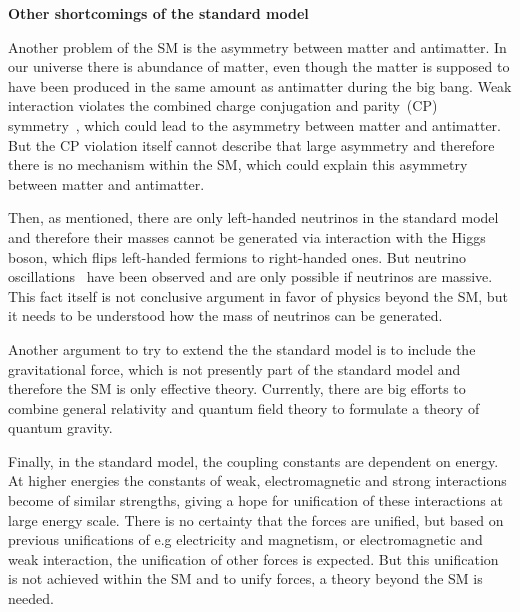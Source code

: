 
\textbf{Other shortcomings of the standard model}

Another problem of the SM is the asymmetry between matter and antimatter. In our universe there is abundance of matter, even though the matter is supposed to have been produced in the same amount as antimatter during the big bang.  Weak interaction violates the combined charge conjugation and parity~(CP) symmetry~\cite{Kobayashi:1973fv}, which could lead to the asymmetry between matter and antimatter. But the CP violation itself cannot describe that large asymmetry and therefore there is no mechanism within the SM, which could explain this asymmetry between matter and antimatter.

Then, as mentioned, there are only left-handed neutrinos in the standard model and therefore their masses cannot be generated via interaction with the Higgs boson, which flips left-handed fermions to right-handed ones. But neutrino oscillations~\cite{Fukuda:1998mi, Ahmad:2001an} have been observed and are only possible if neutrinos are massive. This fact itself is not conclusive argument in favor of physics beyond the SM, but it needs to be understood how the mass of neutrinos can be generated.

Another argument to try to extend the the standard model is to include the gravitational force, which is not presently part of the standard model and therefore the SM is only effective theory. Currently, there are big efforts to combine general relativity and quantum field theory to formulate a theory of quantum gravity.  

Finally, in the standard model, the coupling constants are dependent on energy. At higher energies the constants of weak, electromagnetic and strong interactions become of similar strengths, giving a hope for unification of these interactions at large energy scale. There is no certainty that the forces are unified, but based on previous unifications of e.g electricity and magnetism, or electromagnetic and weak interaction, the unification of other forces is expected. But this unification is not achieved within the SM and to unify forces, a theory beyond the SM is needed.
 

